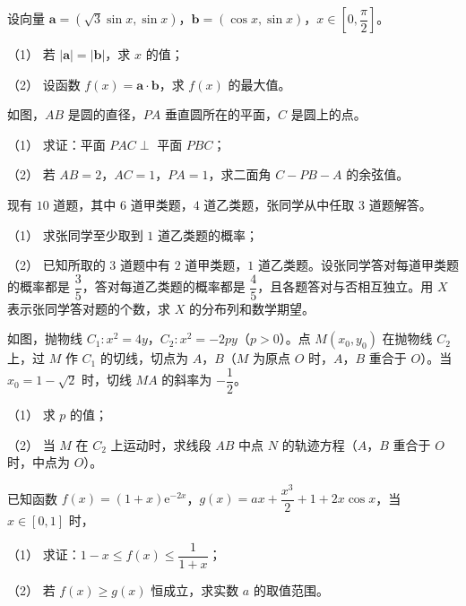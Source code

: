 \begin{question}
设向量 $\boldsymbol a=(\sqrt3\sin x,\sin x)$，$\boldsymbol b=(\cos x,\sin x)$，$x\in\left[0,\dfrac{\pi}2\right]$。

（1） 若 $|\boldsymbol a|=|\boldsymbol b|$，求 $x$ 的值；

（2） 设函数 $f(x)=\boldsymbol a\cdot\boldsymbol b$，求 $f(x)$ 的最大值。

\Needspace{0.4\textheight}
\end{question}
\begin{question}
如图，$AB$ 是圆的直径，$PA$ 垂直圆所在的平面，$C$ 是圆上的点。

（1） 求证：平面 $PAC\perp$ 平面 $PBC$；

（2） 若 $AB=2$，$AC=1$，$PA=1$，求二面角 $C-PB-A$ 的余弦值。
\nopagebreak[4]
\begin{center}\end{center}
\nopagebreak[4]
\end{question}
\begin{question}
现有 $10$ 道题，其中 $6$ 道甲类题，$4$ 道乙类题，张同学从中任取 $3$ 道题解答。

（1） 求张同学至少取到 $1$ 道乙类题的概率；

（2） 已知所取的 $3$ 道题中有 $2$ 道甲类题，$1$ 道乙类题。设张同学答对每道甲类题的概率都是 $\dfrac35$，答对每道乙类题的概率都是 $\dfrac45$，且各题答对与否相互独立。用 $X$ 表示张同学答对题的个数，求 $X$ 的分布列和数学期望。

\Needspace{0.4\textheight}
\end{question}
\begin{question}
如图，抛物线 $C_1:x^2=4y$，$C_2:x^2=-2py$（$p>0$）。点 $M(x_0,y_0)$ 在抛物线 $C_2$ 上，过 $M$ 作 $C_1$ 的切线，切点为 $A$，$B$（$M$ 为原点 $O$ 时，$A$，$B$ 重合于 $O$）。当 $x_0=1-\sqrt2$ 时，切线 $MA$ 的斜率为 $-\dfrac12$。

（1） 求 $p$ 的值；

（2） 当 $M$ 在 $C_2$ 上运动时，求线段 $AB$ 中点 $N$ 的轨迹方程（$A$，$B$ 重合于 $O$ 时，中点为 $O$）。
\nopagebreak[4]
\begin{center}\end{center}
\nopagebreak[4]
\end{question}
\begin{question}
已知函数 $f(x)=(1+x)\mathrm e^{-2x}$，$g(x)=ax+\dfrac{x^3}2+1+2x\cos x$，当 $x\in[0,1]$ 时，

（1） 求证：$1-x\leqslant f(x)\leqslant\dfrac1{1+x}$；

（2） 若 $f(x)\geqslant g(x)$ 恒成立，求实数 $a$ 的取值范围。

\Needspace{0.4\textheight}
\end{question}
